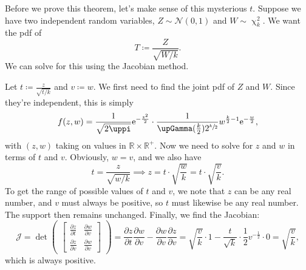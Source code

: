 Before we prove this theorem, let's make sense of this mysterious \(t\). 
Suppose we have two independent random variables, \(Z\sim \mathscr{N}(0,1)\) and \(W\sim \upchi_k^2\). 
We want the pdf of\[
T \coloneq \frac{Z}{\sqrt{W/k}}. 
\]We can solve for this using the Jacobian method. 

Let \(t\coloneq \frac{z}{\sqrt{t/k}}\) and \(v\coloneq w\). 
We first need to find the joint pdf of \(Z\) and \(W\). 
Since they're independent, this is simply\[
    f(z,w) = \frac{1}{\sqrt{2\uppi}} \e^{-\frac{z^2}{2}} \cdot \frac{1}{\upGamma(\frac{k}{2}) 2^{\sfrac{k}{2}}} w^{\frac{k}{2} - 1} \e^{-\frac{w}{2}}, 
\]with \((z,w)\) taking on values in \(\mathbb{R}\times\mathbb{R}^+\). 
Now we need to solve for \(z\) and \(w\) in terms of \(t\) and \(v\). 
Obviously, \(w = v\), and we also have\[
    t = \frac{z}{\sqrt{w/k}} \implies z = t\cdot \sqrt{\frac{w}{k}} = t\cdot \sqrt{\frac{v}{k}}. 
\]To get the range of possible values of \(t\) and \(v\), we note that \(z\) can be any real number, and \(v\) must always be positive, so \(t\) must likewise be any real number. 
The support then remains unchanged. 
Finally, we find the Jacobian:\[
    \mathscr{J} = \det\begin{pmatrix}
        \begin{bmatrix}
            \frac{\partial z}{\partial t} & \frac{\partial w}{\partial v} \\ 
            \frac{\partial z}{\partial v} & \frac{\partial w}{\partial v}
        \end{bmatrix}
    \end{pmatrix} = \frac{\partial z}{\partial t}\frac{\partial w}{\partial v} - \frac{\partial w}{\partial v}\frac{\partial z}{\partial v} = \sqrt{\frac{v}{k}} \cdot 1 - \frac{t}{\sqrt{k}}\cdot \frac{1}{2} v^{-\frac{1}{2}} \cdot 0 = \sqrt{\frac{v}{k}},
\]which is always positive. 
